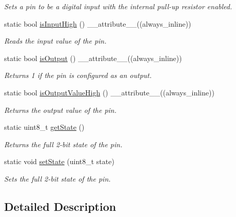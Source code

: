 \begin{DoxyCompactItemize}
\begin{DoxyCompactList}\small\item\em Sets a pin to be a digital input with the internal pull-\/up resistor enabled. \end{DoxyCompactList}\item 
static bool \hyperlink{class_fast_g_p_i_o_1_1_pin_acbc38591335717f3feeed14f53b7b79c}{is\+Input\+High} () \+\_\+\+\_\+attribute\+\_\+\+\_\+((always\+\_\+inline))
\begin{DoxyCompactList}\small\item\em Reads the input value of the pin. \end{DoxyCompactList}\item 
static bool \hyperlink{class_fast_g_p_i_o_1_1_pin_ae068011f1d705b9f8f889b32c4b315b3}{is\+Output} () \+\_\+\+\_\+attribute\+\_\+\+\_\+((always\+\_\+inline))
\begin{DoxyCompactList}\small\item\em Returns 1 if the pin is configured as an output. \end{DoxyCompactList}\item 
static bool \hyperlink{class_fast_g_p_i_o_1_1_pin_a28b30134fd55972feb708f07ec8104b7}{is\+Output\+Value\+High} () \+\_\+\+\_\+attribute\+\_\+\+\_\+((always\+\_\+inline))
\begin{DoxyCompactList}\small\item\em Returns the output value of the pin. \end{DoxyCompactList}\item 
static uint8\+\_\+t \hyperlink{class_fast_g_p_i_o_1_1_pin_a79035949bafe62634210dd41486dba2c}{get\+State} ()
\begin{DoxyCompactList}\small\item\em Returns the full 2-\/bit state of the pin. \end{DoxyCompactList}\item 
static void \hyperlink{class_fast_g_p_i_o_1_1_pin_a6dae3821c6b8bcf9f3b7ac2e5114692c}{set\+State} (uint8\+\_\+t state)
\begin{DoxyCompactList}\small\item\em Sets the full 2-\/bit state of the pin. \end{DoxyCompactList}\end{DoxyCompactItemize}


\subsection{Detailed Description}
